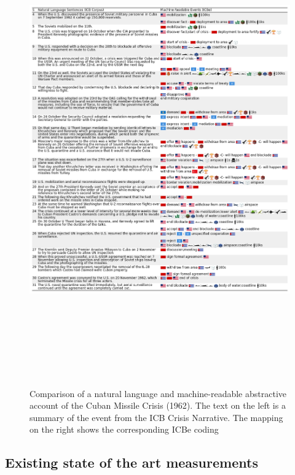 \documentclass{article}
\begin{document}
\begin{figure}
\hypertarget{fig-cubanarrative}{%
\centering
\includegraphics[width=7in,height=8in]{case_study_cuban_precision.png}
\caption{Comparison of a natural language and machine-readable
abstractive account of the Cuban Missile Crisis (1962). The text on the
left is a summary of the event from the ICB Crisis Narrative. The
mapping on the right shows the corresponding ICBe
coding}\label{fig-cubanarrative}
}
\end{figure}

\hypertarget{existing-state-of-the-art-measurements}{%
\subsection{Existing state of the art
measurements}\label{existing-state-of-the-art-measurements}}
\end{document}
